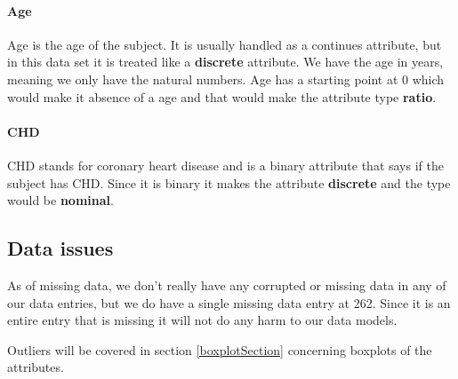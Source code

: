 \paragraph{Age} Age is the age of the subject. It is usually handled as a continues attribute, but in this data set it is treated like a \textbf{discrete} attribute. We have the age in years, meaning we only have the natural numbers. Age has a starting point at 0 which would make it absence of a age and that would make the attribute type \textbf{ratio}.

\paragraph{CHD} CHD stands for coronary heart disease and is a binary attribute that says if the subject has CHD. Since it is binary it makes the attribute \textbf{discrete} and the type would be \textbf{nominal}.

\subsection{Data issues}
As of missing data, we don't really have any corrupted or missing data in any of our data entries, but we do have a single missing data entry at 262. Since it is an entire entry that is missing it will not do any harm to our data models.

Outliers will be covered in section \ref{boxplotSection} concerning boxplots of the attributes.
